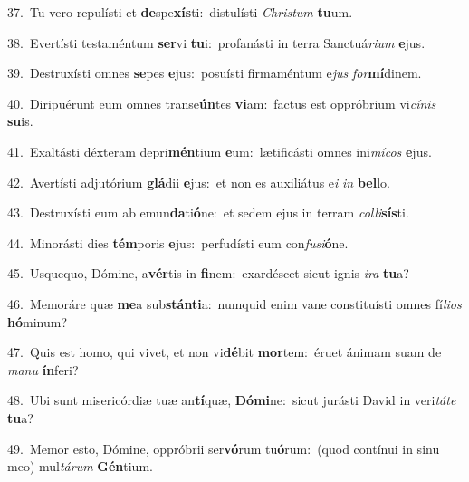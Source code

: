 {\numbfont\textcolor{\numbcolor}{37.}}~Tu vero repulísti et \textbf{de}\-spe\-\textbf{xís}\-ti:~\star distulísti \textit{Chris}\-\textit{tum} \textbf{tu}\-um.\par
{\numbfont\textcolor{\numbcolor}{38.}}~Evertísti testaméntum \textbf{ser}\-vi \textbf{tu}\-i:~\star profanásti in terra Sanctuá\-\textit{ri}\-\textit{um} \textbf{e}\-jus.\par
{\numbfont\textcolor{\numbcolor}{39.}}~Destruxísti omnes \textbf{se}\-pes \textbf{e}\-jus:~\star posuísti firmaméntum e\textit{jus} \textit{for}\-\textbf{mí}dinem.\par
{\numbfont\textcolor{\numbcolor}{40.}}~Diripuérunt eum omnes transe\-\textbf{ún}\-tes \textbf{vi}\-am:~\star factus est oppróbrium vi\-\textit{cí}\-\textit{nis} \textbf{su}\-is.\par
{\numbfont\textcolor{\numbcolor}{41.}}~Exaltásti déxteram depri\-\textbf{mén}\-tium \textbf{e}\-um:~\star lætificásti omnes ini\-\textit{mí}\-\textit{cos} \textbf{e}\-jus.\par
{\numbfont\textcolor{\numbcolor}{42.}}~Avertísti adjutórium \textbf{glá}\-dii \textbf{e}\-jus:~\star et non es auxiliátus e\textit{i} \textit{in} \textbf{bel}\-lo.\par
{\numbfont\textcolor{\numbcolor}{43.}}~Destruxísti eum ab emun\-\textbf{da}\-ti\-\textbf{ó}\-ne:~\star et sedem ejus in terram \textit{col}\-\textit{li}\textbf{sís}ti.\par
{\numbfont\textcolor{\numbcolor}{44.}}~Minorásti dies \textbf{tém}\-poris \textbf{e}\-jus:~\star perfudísti eum con\-\textit{fu}\-\textit{si}\textbf{ó}ne.\par
{\numbfont\textcolor{\numbcolor}{45.}}~Usquequo, Dómine, a\-\textbf{vér}\-tis in \textbf{fi}\-nem:~\star exardéscet sicut ignis \textit{i}\-\textit{ra} \textbf{tu}\-a?\par
{\numbfont\textcolor{\numbcolor}{46.}}~Memoráre quæ \textbf{me}\-a sub\-\textbf{stán}\-\textbf{ti}a:~\star numquid enim vane constituísti omnes fí\-\textit{li}\-\textit{os} \textbf{hó}\-minum?\par
{\numbfont\textcolor{\numbcolor}{47.}}~Quis est homo, qui vivet, et non vi\-\textbf{dé}\-bit \textbf{mor}\-tem:~\star éruet ánimam suam de \textit{ma}\-\textit{nu} \textbf{ín}\-feri?\par
{\numbfont\textcolor{\numbcolor}{48.}}~Ubi sunt misericórdiæ tuæ an\-\textbf{tí}\-quæ, \textbf{Dó}\-\textbf{mi}ne:~\star sicut jurásti David in veri\-\textit{tá}\-\textit{te} \textbf{tu}\-a?\par
{\numbfont\textcolor{\numbcolor}{49.}}~Memor esto, Dómine, oppróbrii ser\-\textbf{vó}\-rum tu\-\textbf{ó}\-rum:~\star (quod contínui in sinu meo) mul\-\textit{tá}\-\textit{rum} \textbf{Gén}\-tium.\par
